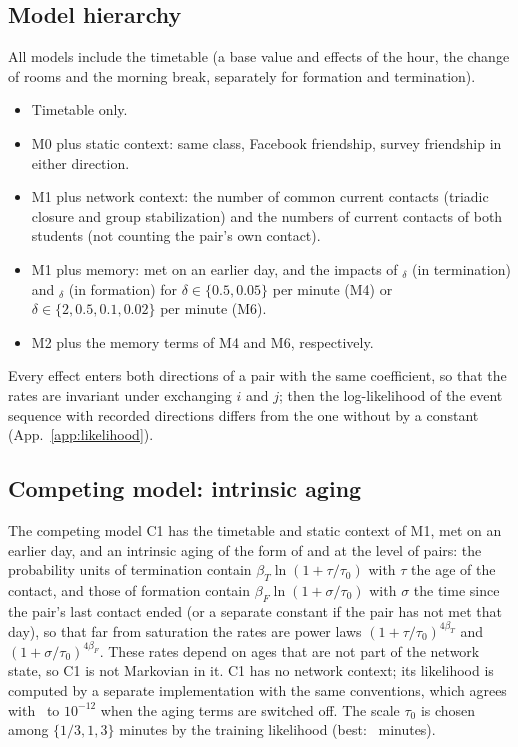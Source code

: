 \subsection{Model hierarchy}
All models include the timetable (a base value and effects of the hour, the change of rooms and the morning break, separately for formation and termination).
\begin{itemize}
\item[M0] Timetable only.
\item[M1] M0 plus static context: same class, Facebook friendship, survey friendship in either direction.
\item[M2] M1 plus network context: the number of common current contacts (triadic closure and group stabilization) and the numbers of current contacts of both students (not counting the pair's own contact).
\item[M4, M6] M1 plus memory: met on an earlier day, and the impacts of $_\delta$ (in termination) and $_\delta$ (in formation) for $\delta \in \{0.5, 0.05\}$ per minute (M4) or $\delta \in \{2, 0.5, 0.1, 0.02\}$ per minute (M6).
\item[M3, M5] M2 plus the memory terms of M4 and M6, respectively.
\end{itemize}
Every effect enters both directions of a pair with the same coefficient, so that the rates are invariant under exchanging $i$ and $j$; then the log-likelihood of the event sequence with recorded directions differs from the one without by a constant (App.~\ref{app:likelihood}).

\subsection{Competing model: intrinsic aging}
The competing model C1 has the timetable and static context of M1, met on an earlier day, and an intrinsic aging of the form of \citet{zhao2011} and \citet{starnini2013} at the level of pairs: the probability units of termination contain $\beta_T \ln(1 + \tau/\tau_0)$ with $\tau$ the age of the contact, and those of formation contain $\beta_F \ln(1 + \sigma/\tau_0)$ with $\sigma$ the time since the pair's last contact ended (or a separate constant if the pair has not met that day), so that far from saturation the rates are power laws $(1 + \tau/\tau_0)^{4\beta_T}$ and $(1 + \sigma/\tau_0)^{4\beta_F}$.
These rates depend on ages that are not part of the network state, so C1 is not Markovian in it.
C1 has no network context; its likelihood is computed by a separate implementation with the same conventions, which agrees with \tricl\ to $10^{-12}$ when the aging terms are switched off.
The scale $\tau_0$ is chosen among $\{1/3, 1, 3\}$ minutes by the training likelihood (best: \ConeAgeScale\ minutes).

